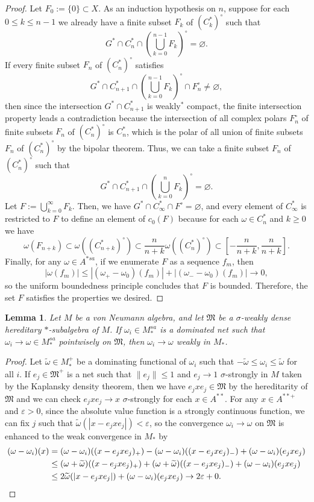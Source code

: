 \documentclass[a4paper]{amsart}
\newcommand{\e}{\varepsilon}
\theoremstyle{plain}
\newtheorem{lem}[thm]{Lemma}
\theoremstyle{definition}
\begin{document}
\begin{proof}
Let $F_0:=\{0\}\subset X$.
As an induction hypothesis on $n$, suppose for each $0\le k\le n-1$ we already have a finite subset $F_k$ of $(C_k^*)^\circ$ such that
\[G^*\cap C^*_n\cap\left(\bigcup_{k=0}^{n-1}F_k\right)^\circ=\varnothing.\]
If every finite subset $F_n$ of $(C_n^*)^\circ$ satisfies
\[G^*\cap C_{n+1}^*\cap\left(\bigcup_{k=0}^{n-1}F_k\right)^\circ\cap F_n^\circ\ne\varnothing,\]
then since the intersection $G^*\cap C_{n+1}^*$ is weakly$^*$ compact, the finite intersection property leads a contradiction because the intersection of all complex polars $F_n^\circ$ of finite subsets $F_n$ of $(C_n^*)^\circ$ is $C_n^*$, which is the polar of all union of finite subsets $F_n$ of $(C_n^*)^\circ$ by the bipolar theorem.
Thus, we can take a finite subset $F_n$ of $(C_n^*)^\circ$ such that
\[G^*\cap C_{n+1}^*\cap\left(\bigcup_{k=0}^nF_k\right)^\circ=\varnothing.\]
Let $F:=\bigcup_{k=0}^\infty F_k$.
Then, we have $G^*\cap C_\infty^*\cap F^\circ=\varnothing$, and every element of $C_\infty^*$ is restricted to $F$ to define an element of $c_0(F)$ because for each $\omega\in C_n^*$ and $k\ge0$ we have 
\[\omega(F_{n+k})\subset\omega((C_{n+k}^*)^\circ)\subset\frac n{n+k}\omega((C_n^*)^\circ)\subset[-\frac n{n+k},\frac n{n+k}].\]
Finally, for any $\omega\in A^{*sa}$, if we enumerate $F$ as a sequence $f_m$, then
\[|\omega(f_m)|\le|(\omega_+-\omega_0)(f_m)|+|(\omega_--\omega_0)(f_m)|\to0,\]
so the uniform boundedness principle concludes that $F$ is bounded.
Therefore, the set $F$ satisfies the properties we desired.
\end{proof}


\begin{lem}
Let $M$ be a von Neumann algebra, and let $\mathfrak{M}$ be a $\sigma$-weakly dense hereditary $*$-subalgebra of $M$.
If $\omega_i\in M_*^{sa}$ is a dominated net such that $\omega_i\to\omega\in M_*^{sa}$ pointwisely on $\mathfrak{M}$, then $\omega_i\to\omega$ weakly in $M_*$.
\end{lem}
\begin{proof}
Let $\widetilde\omega\in M_*^+$ be a dominating functional of $\omega_i$ such that $-\widetilde\omega\le\omega_i\le\widetilde\omega$ for all $i$.
If $e_j\in\mathfrak{M}^+$ is a net such that $\|e_j\|\le1$ and $e_j\to1$ $\sigma$-strongly in $M$ taken by the Kaplansky density theorem, then we have $e_jxe_j\in\mathfrak{M}$ by the hereditarity of $\mathfrak{M}$ and we can check $e_jxe_j\to x$ $\sigma$-strongly for each $x\in A^{**}$.
For any $x\in A^{**+}$ and $\e>0$, since the absolute value function is a strongly continuous function, we can fix $j$ such that $\widetilde\omega(|x-e_jxe_j|)<\e$, so the convergence $\omega_i\to\omega$ on $\mathfrak{M}$ is enhanced to the weak convergence in $M_*$ by
\begin{align*}
(\omega-\omega_i)(x)
&=(\omega-\omega_i)((x-e_jxe_j)_+)-(\omega-\omega_i)((x-e_jxe_j)_-)+(\omega-\omega_i)(e_jxe_j)\\
&\le(\omega+\widetilde\omega)((x-e_jxe_j)_+)+(\omega+\widetilde\omega)((x-e_jxe_j)_-)+(\omega-\omega_i)(e_jxe_j)\\
&\le2\widetilde\omega(|x-e_jxe_j|)+(\omega-\omega_i)(e_jxe_j)\to2\e+0.\qedhere
\end{align*}
\end{proof}
\end{document}
